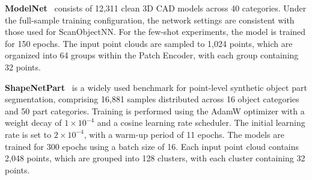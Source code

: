 
\textbf{ModelNet}~\cite{wu20153d} consists of 12,311 clean 3D CAD models across 40 categories. Under the full-sample training configuration, the network settings are consistent with those used for ScanObjectNN. For the few-shot experiments, the model is trained for 150 epochs. The input point clouds are sampled to 1,024 points, which are organized into 64 groups within the Patch Encoder, with each group containing 32 points.



\textbf{ShapeNetPart}~\cite{yi2016scalable} is a widely used benchmark for point-level synthetic object part segmentation, comprising 16,881 samples distributed across 16 object categories and 50 part categories. Training is performed using the AdamW optimizer with a weight decay of $1 \times 10^{-4}$ and a cosine learning rate scheduler. The initial learning rate is set to $2 \times 10^{-4}$, with a warm-up period of 11 epochs. The models are trained for 300 epochs using a batch size of 16. Each input point cloud contains 2,048 points, which are grouped into 128 clusters, with each cluster containing 32 points.




